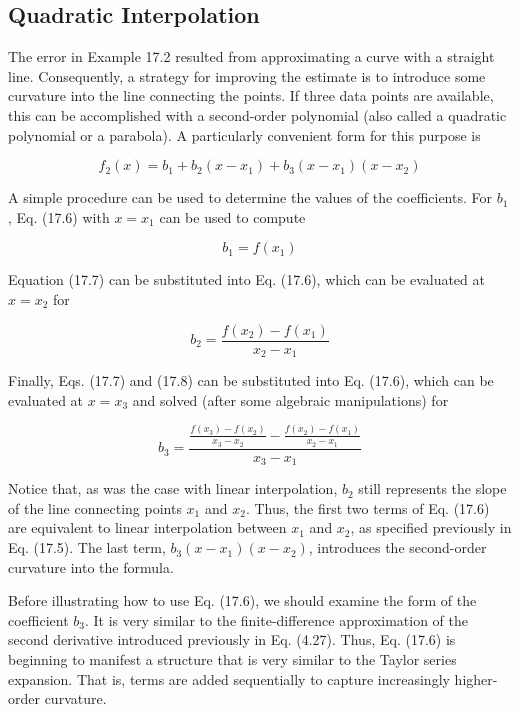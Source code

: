 \documentclass[../main.tex]{subfiles}
\begin{document}

\label{cha:cha_P_17_2_2}
\subsection{Quadratic Interpolation}

\noindent The error in Example 17.2 resulted from approximating a curve with a straight line. Consequently, a strategy for improving the estimate is to introduce some curvature into the line
connecting the points. If three data points are available, this can be accomplished with a
second-order polynomial (also called a quadratic polynomial or a parabola). A particularly
convenient form for this purpose is

\begin{equation}
	\tag{17.6}
	f_2(x) = b_1 + b_2 (x - x_1) + b_3 (x-x_1) (x - x_2)
\end{equation}

A simple procedure can be used to determine the values of the coefficients. For $b_1$,
Eq. (17.6) with $x = x_1$ can be used to compute

\begin{equation}
	\tag{17.7}
	b_1 = f(x_1)
\end{equation}

\noindent Equation (17.7) can be substituted into Eq. (17.6), which can be evaluated at $x = x_2$ for

\begin{equation}
	\tag{17.8}
	b_2 = \frac{f(x_2) - f(x_1)}{x_2 - x_1}
\end{equation}

\noindent Finally, Eqs. (17.7) and (17.8) can be substituted into Eq. (17.6), which can be evaluated at
$x = x_3$ and solved (after some algebraic manipulations) for

\begin{equation}
	\tag{17.9}
	b_3 = \frac{
		\frac{f(x_3) - f(x_2)}{x_3 - x_2} - \frac{f(x_2) - f(x_1)}{x_2 - x_1}
	}{x_3 - x_1}
\end{equation}

Notice that, as was the case with linear interpolation, $b_2$ still represents the slope of the
line connecting points $x_1$ and $x_2$. Thus, the first two terms of Eq. (17.6) are equivalent to
linear interpolation between $x_1$ and $x_2$, as specified previously in Eq. (17.5). The last term,
$b_3 (x - x_1 )(x - x_2)$, introduces the second-order curvature into the formula.

Before illustrating how to use Eq. (17.6), we should examine the form of the coefficient $b_3$. It is very similar to the finite-difference approximation of the second derivative
introduced previously in Eq. (4.27). Thus, Eq. (17.6) is beginning to manifest a structure
that is very similar to the Taylor series expansion. That is, terms are added sequentially to
capture increasingly higher-order curvature.
\end{document}
